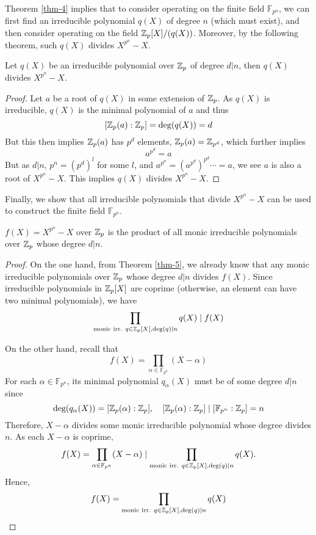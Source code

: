Theorem \ref{thm-4} implies that to consider operating on the finite field $\mathbb{F}_{p^n}$, we can first find an irreducible polynomial $q(X)$ of degree $n$ (which must exist), and then consider operating on the field $\mathbb{Z}_p[X] / (q(X))$. Moreover, by the following theorem, such $q(X)$ divides $X^{p^n} - X$.

\begin{theorem}
\label{thm-5}
Let $q(X)$ be an irreducible polynomial over $\mathbb{Z}_p$ of degree $d |n$, then $q(X)$ divides $X^{p^n} - X$.
\end{theorem}

\begin{proof}

Let $a$ be a root of $q(X)$ in some extension of $\mathbb{Z}_p$. As $q(X)$ is irreducible, $q(X)$ is the minimal polynomial of $a$ and thus
\[
	[\mathbb{Z}_p(a) : \mathbb{Z}_p] = \text{deg}(q(X)) = d
\]
But this then implies $\mathbb{Z}_p(a)$ has $p^d$ elements, $\mathbb{Z}_p(a) = \mathbb{Z}_{p^d}$, which further implies
\[
	a^{p^d} = a
\]
But as $d | n$, $p^n = (p^d)^l$ for some $l$, and $a^{p^n} = (a^{p^d})^{p^d} \cdots = a$, we see $a$ is also a root of $X^{p^n} - X$. This implies $q(X)$ divides $X^{p^n} - X$.

\end{proof}

Finally, we show that all irreducible polynomials that divide $X^{p^n} - X$ can be used to construct the finite field $\mathbb{F}_{p^n}$.

\begin{theorem}
\label{thm-6}
$f(X) = X^{p^n} - X$ over $\mathbb{Z}_p$ is the product of all monic irreducible polynomials over $\mathbb{Z}_p$ whose degree $d | n$.

\end{theorem}

\begin{proof}

On the one hand, from Theorem \ref{thm-5}, we already know that any monic irreducible polynomials over $\mathbb{Z}_p$ whose degree $d | n$ divides $f(X)$. Since irreducible polynomials in $\mathbb{Z}_p[X]$ are coprime (otherwise, an element can have two minimal polynomials), we have
\[
	\prod_{\text{monic irr. } q \in \mathbb{Z}_p[X], \text{deg}(q)|n} q(X) \mid f(X)
\]

On the other hand, recall that
\[
	f(X) = \prod_{\alpha \in \mathbb{F}_{p^n}} (X-\alpha)
\]
For each $\alpha \in \mathbb{F}_{p^n}$, its minimal polynomial $q_\alpha(X)$ must be of some degree $d | n$ since
\[
\text{deg}(q_\alpha(X)) = [\mathbb{Z}_p(\alpha):\mathbb{Z}_p], \quad [\mathbb{Z}_p(\alpha):\mathbb{Z}_p]  \mid [\mathbb{F}_{p^n} : \mathbb{Z}_p] = n
\]
Therefore, $X-\alpha$ divides some monic irreducible polynomial whose degree divides $n$. As each $X-\alpha$ is coprime,
\[
	f(X) = \prod_{\alpha \in \mathbb{F}_{p^n}} (X-\alpha) \mid \prod_{\text{monic irr. } q \in \mathbb{Z}_p[X], \text{deg}(q)|n} q(X).
\]
Hence,
\[
	f(X) = \prod_{\text{monic irr. } q \in \mathbb{Z}_p[X], \text{deg}(q)|n} q(X)
\]

\end{proof}


